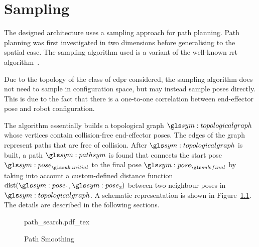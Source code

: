 \chapter{Sampling}%
\label{chap:sampling}

	The designed architecture uses a sampling approach for path planning. Path
	planning was first investigated in two dimensions before generalising to the
	spatial case. The sampling algorithm used is a variant
	of the well-known \gls{rrt}
	algorithm~\cite{bib:planning:rapidly-exploring_random_trees_a_new_tool_for_path_planning}.

	Due to the topology of the class of \gls{cdpr} considered, the sampling
	algorithm does not need to sample in configuration space, but may instead
	sample poses directly. This is due to the fact that there is a one-to-one
	correlation between end-effector pose and robot configuration.

	The algorithm essentially builds a topological graph $\topologicalgraph$
	whose vertices contain collision-free end-effector poses. The edges of the
	graph represent paths that are free of collision. After $\topologicalgraph$
	is built, a path $\pathsym$ is found that connects the start pose
	$\pose_{\initial}$ to the final pose $\pose_{\final}$ by taking into account
	a custom-defined distance function $\dist(\pose_1, \pose_2)$ between two
	neighbour poses in $\topologicalgraph$. A schematic representation is shown
	in Figure~\ref{fig:path_search}. The details are described in the following
	sections.

	\begin{figure}[hb]
		\centering
		\def\svgwidth{\columnwidth}
		{path_search.pdf_tex}
		\caption{Path Smoothing}%
		\label{fig:path_search}
	\end{figure}

	
	
	
	

